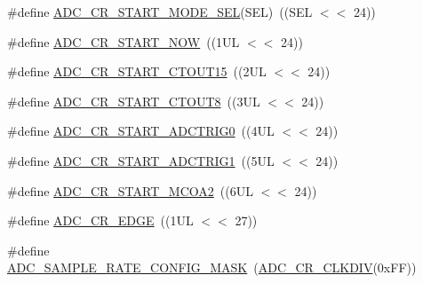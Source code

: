 \begin{DoxyCompactItemize}
\item 
\#define \hyperlink{group__ADC__17XX__40XX_ga1af437f22df0b2b07bef704b23733874}{A\-D\-C\-\_\-\-C\-R\-\_\-\-S\-T\-A\-R\-T\-\_\-\-M\-O\-D\-E\-\_\-\-S\-E\-L}(S\-E\-L)~((S\-E\-L $<$$<$ 24))
\item 
\#define \hyperlink{group__ADC__17XX__40XX_gad9f225e8d5f50609888edab56cd0da5c}{A\-D\-C\-\_\-\-C\-R\-\_\-\-S\-T\-A\-R\-T\-\_\-\-N\-O\-W}~((1\-U\-L $<$$<$ 24))
\item 
\#define \hyperlink{group__ADC__17XX__40XX_gab4000daab3c792e48cf8d3de3e5b0a36}{A\-D\-C\-\_\-\-C\-R\-\_\-\-S\-T\-A\-R\-T\-\_\-\-C\-T\-O\-U\-T15}~((2\-U\-L $<$$<$ 24))
\item 
\#define \hyperlink{group__ADC__17XX__40XX_ga6be3ddfec0f4d7d9b8f56363b100ecef}{A\-D\-C\-\_\-\-C\-R\-\_\-\-S\-T\-A\-R\-T\-\_\-\-C\-T\-O\-U\-T8}~((3\-U\-L $<$$<$ 24))
\item 
\#define \hyperlink{group__ADC__17XX__40XX_gad37a3aadfc28d617b673194170831de6}{A\-D\-C\-\_\-\-C\-R\-\_\-\-S\-T\-A\-R\-T\-\_\-\-A\-D\-C\-T\-R\-I\-G0}~((4\-U\-L $<$$<$ 24))
\item 
\#define \hyperlink{group__ADC__17XX__40XX_ga900f9645ad799143f6db3568947bdf44}{A\-D\-C\-\_\-\-C\-R\-\_\-\-S\-T\-A\-R\-T\-\_\-\-A\-D\-C\-T\-R\-I\-G1}~((5\-U\-L $<$$<$ 24))
\item 
\#define \hyperlink{group__ADC__17XX__40XX_gae86c1cc94b370b0313ea4dbc09514d2f}{A\-D\-C\-\_\-\-C\-R\-\_\-\-S\-T\-A\-R\-T\-\_\-\-M\-C\-O\-A2}~((6\-U\-L $<$$<$ 24))
\item 
\#define \hyperlink{group__ADC__17XX__40XX_ga1d05d43234dd2d1489841dff0012225e}{A\-D\-C\-\_\-\-C\-R\-\_\-\-E\-D\-G\-E}~((1\-U\-L $<$$<$ 27))
\item 
\#define \hyperlink{group__ADC__17XX__40XX_ga6dbeade89e0f847f5c6661b2785fbf9b}{A\-D\-C\-\_\-\-S\-A\-M\-P\-L\-E\-\_\-\-R\-A\-T\-E\-\_\-\-C\-O\-N\-F\-I\-G\-\_\-\-M\-A\-S\-K}~(\hyperlink{group__ADC__17XX__40XX_gad2327ec652bedf37c800e077cc46d904}{A\-D\-C\-\_\-\-C\-R\-\_\-\-C\-L\-K\-D\-I\-V}(0x\-F\-F))
\end{DoxyCompactItemize}
